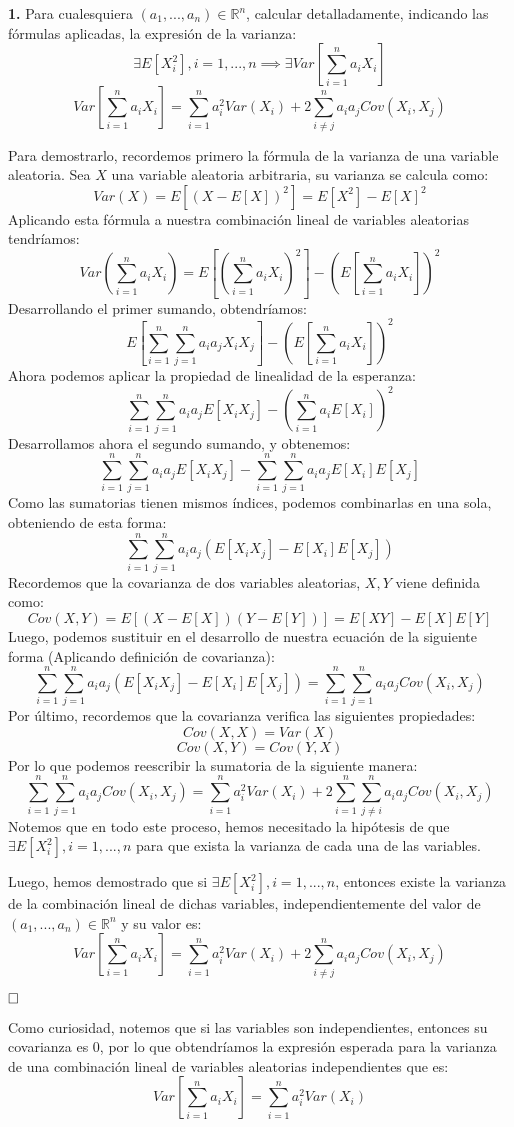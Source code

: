 \documentclass[a4paper, 12pt]{article}
\theoremstyle{plain}
\theoremstyle{definition}
\theoremstyle{remark}
\begin{document}
	\begin{flushleft}
		\textbf{1.} Para cualesquiera $(a_1,...,a_n) \in \mathbb{R}^n$, calcular detalladamente, indicando las fórmulas aplicadas, la expresión de la varianza:
		\[
		\exists E[X_i^2],i=1,...,n \implies \exists Var \left[\sum_{i=1}^{n}a_iX_i\right]
		\]
		\[
		Var \left[\sum_{i=1}^{n}a_iX_i\right] = \sum_{i=1}^{n}a_i^2Var(X_i)+2\sum_{i\not = j}^{n}a_ia_jCov(X_i,X_j)
		\]
	\end{flushleft}
	Para demostrarlo, recordemos primero la fórmula de la varianza de una variable aleatoria. Sea $X$ una variable aleatoria arbitraria, su varianza se calcula como:
	\[
	Var(X)=E\left[(X-E[X])^2\right]=E[X^2]-E[X]^2
	\]
	Aplicando esta fórmula a nuestra combinación lineal de variables aleatorias tendríamos:
	\[
	Var\left(\sum_{i=1}^{n}a_iX_i\right)=E\left[\left(\sum_{i=1}^{n}a_iX_i\right)^2\right]-\left(E\left[\sum_{i=1}^{n}a_iX_i\right]\right)^2
	\]
	Desarrollando el primer sumando, obtendríamos:
	\[
	E\left[\sum_{i=1}^{n}\sum_{j=1}^{n}a_ia_jX_iX_j\right]-\left(E\left[\sum_{i=1}^{n}a_iX_i\right]\right)^2
	\]
	Ahora podemos aplicar la propiedad de linealidad de la esperanza:
	\[
	\sum_{i=1}^{n}\sum_{j=1}^{n}a_ia_jE\left[X_iX_j\right]-\left(\sum_{i=1}^{n}a_iE[X_i]\right)^2
	\]
	Desarrollamos ahora el segundo sumando, y obtenemos:
	\[
	\sum_{i=1}^{n}\sum_{j=1}^{n}a_ia_jE\left[X_iX_j\right]-\sum_{i=1}^{n}\sum_{j=1}^{n}a_ia_jE\left[X_i\right]E[X_j]
	\]
	Como las sumatorias tienen mismos índices, podemos combinarlas en una sola, obteniendo de esta forma:
	\[
	\sum_{i=1}^{n}\sum_{j=1}^{n}a_ia_j\left(E[X_iX_j]-E[X_i]E[X_j]\right)
	\]
	Recordemos que la covarianza de dos variables aleatorias, $X,Y$ viene definida como:
	\[
	Cov(X,Y)=E\left[(X-E[X])(Y-E[Y])\right]=E[XY]-E[X]E[Y]
	\]
	Luego, podemos sustituir en el desarrollo de nuestra ecuación de la siguiente forma (Aplicando definición de covarianza):
	\[
	\sum_{i=1}^{n}\sum_{j=1}^{n}a_ia_j\left(E[X_iX_j]-E[X_i]E[X_j]\right)=
	\sum_{i=1}^{n}\sum_{j=1}^{n}a_ia_jCov(X_i,X_j)
	\]
	Por último, recordemos que la covarianza verifica las siguientes propiedades:
	\[
	Cov(X,X)=Var(X)
	\]
	\[
	Cov(X,Y)=Cov(Y,X)
	\]
	Por lo que podemos reescribir la sumatoria de la siguiente manera:
	\[
	\sum_{i=1}^{n}\sum_{j=1}^{n}a_ia_jCov(X_i,X_j)=\sum_{i=1}^{n}a_i^2Var(X_i)+2\sum_{i=1}^{n}\sum_{j\not =i}^{n}a_ia_jCov(X_i,X_j)
	\]
	Notemos que en todo este proceso, hemos necesitado la hipótesis de que $\exists E[X_i^2], i=1,...,n$ para que exista la varianza de cada una de las variables.
	
	\bigskip
	Luego, hemos demostrado que si $\exists E[X_i^2], i=1,...,n$, entonces existe la varianza de la combinación lineal de dichas variables, independientemente del valor de $(a_1,...,a_n)\in\mathbb{R}^n$ y su valor es:
	\[
	Var \left[\sum_{i=1}^{n}a_iX_i\right] = \sum_{i=1}^{n}a_i^2Var(X_i)+2\sum_{i\not = j}^{n}a_ia_jCov(X_i,X_j)
	\]
	
	$\hfill\square$
	
	\bigskip
	Como curiosidad, notemos que si las variables son independientes, entonces su covarianza es 0, por lo que obtendríamos la expresión esperada para la varianza de una combinación lineal de variables aleatorias independientes que es:
	\[
	Var \left[\sum_{i=1}^{n}a_iX_i\right] = \sum_{i=1}^{n}a_i^2Var(X_i)
	\]
	
\end{document}
